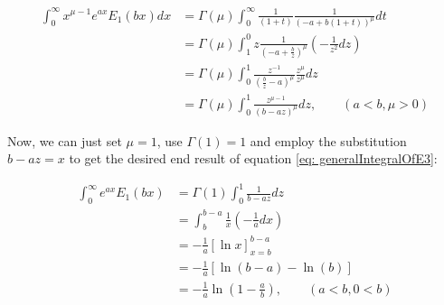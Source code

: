 \documentclass[bibliography=totocnumbered]{scrartcl}
\newcommand{\assume}[1][\text{MISSING PARAMETER}]{,\qquad\left(#1\right)}
\begin{document}
			\begin{align}
				\int_{0}^{\infty}x^{\mu-1}e^{ax}E_1\left(bx\right)dx&=\Gamma\left(\mu\right)\int_{0}^{\infty}\frac{1}{\left(1+t\right)}\frac{1}{\left(-a+b\left(1+t\right)\right)^\mu}dt\\
				&=\Gamma\left(\mu\right)\int_{1}^{0}z\frac{1}{\left(-a+\frac{b}{z}\right)^{\mu}}\left(-\frac{1}{z^2}dz\right)\\
				&=\Gamma\left(\mu\right)\int_{0}^{1}\frac{z^{-1}}{\left(\frac{b}{z}-a\right)^{\mu}}\frac{z^{\mu}}{z^{\mu}}dz\\
				&=\Gamma\left(\mu\right)\int_{0}^{1}\frac{z^{\mu-1}}{\left(b-az\right)^{\mu}}dz\assume[a<b, \mu>0]
			\end{align}

			Now, we can just set $\mu=1$, use $\Gamma\left(1\right)=1$ and employ the substitution $b-az=x$ to get the desired end result of equation \eqref{eq: generalIntegralOfE3}:

			\begin{align}
				\int_{0}^{\infty}e^{ax}E_1\left(bx\right)&=\Gamma\left(1\right)\int_{0}^{1}\frac{1}{b-az}dz\\
				&=\int_{b}^{b-a}\frac{1}{x}\left(-\frac{1}{a}dx\right)\\
				&=-\frac{1}{a}\left[\ln{x}\right]^{b-a}_{x=b}\\
				&=-\frac{1}{a}\left[\ln{\left(b-a\right)}-\ln{\left(b\right)}\right]\\
				&=-\frac{1}{a}\ln{\left(1-\frac{a}{b}\right)}\assume[a<b, 0<b]
			\end{align}
\end{document}
